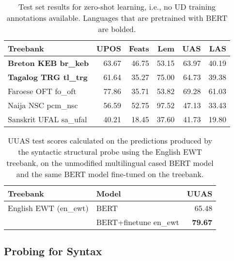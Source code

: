 \documentclass[11pt,a4paper]{article}
\begin{document}
\begin{table}[!t]
    \fontsize{8}{10}\selectfont
    \begin{center}
    \setlength{\tabcolsep}{3pt}
    \begin{tabularx}{\linewidth}{@{}Xrrrrr@{}}
    \toprule
         \sc Treebank & \sc UPOS & \sc Feats & \sc Lem & \sc UAS & \sc LAS \\
    \midrule
         \bf Breton KEB \hfill\hfill br\_keb & 63.67 &  46.75 &  53.15 & 63.97 & 40.19 \\
         \bf Tagalog TRG \hfill\hfill tl\_trg & 61.64 &  35.27 &  75.00 & 64.73 & 39.38 \\
         Faroese OFT \hfill\hfill fo\_oft & 77.86 &  35.71 &  53.82 & 69.28 & 61.03 \\
         Naija NSC \hfill\hfill pcm\_nsc & 56.59 &  52.75 &  97.52 & 47.13 & 33.43 \\
         Sanskrit UFAL \hfill\hfill sa\_ufal & 40.21 &  18.45 &  37.60 & 41.73 & 19.80 \\
    \bottomrule
\end{tabularx}
    \end{center}
    \caption{\label{table:zero-shot-results} 
        Test set results for zero-shot learning, i.e., no UD training annotations available. 
        Languages that are pretrained with BERT are bolded.
    }
\end{table}

\begin{table}[!ht]
    \fontsize{8}{10}\selectfont
    \begin{center}
    \begin{tabular}{@{}llr@{}}
    \toprule
         \sc Treebank & \sc Model & \sc UUAS \\
    \midrule
English EWT (en\_ewt) & BERT  & 65.48 \\
                                & BERT+finetune en\_ewt & \bf 79.67 \\
    \bottomrule
    \end{tabular}
    \end{center}
    \caption{\label{table:probe-comparison}
        UUAS test scores calculated on the predictions produced by the syntactic structural probe \cite{hewitt2019structural} using the English EWT treebank, on the unmodified multilingual cased BERT model and the same BERT model fine-tuned on the treebank.
    }
\end{table}

\subsection{Probing for Syntax}
\end{document}
